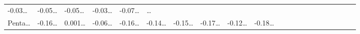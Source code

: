 \documentclass[
]{article}
\begin{document}
\begin{longtable}[]{@{}lllllllllllllllllllll@{}}
\begin{minipage}[t]{0.03\columnwidth}
-0.03\ldots{}\strut
\end{minipage} & \begin{minipage}[t]{0.03\columnwidth}\raggedright
-0.05\ldots{}\strut
\end{minipage} & \begin{minipage}[t]{0.03\columnwidth}\raggedright
-0.05\ldots{}\strut
\end{minipage} & \begin{minipage}[t]{0.03\columnwidth}\raggedright
-0.03\ldots{}\strut
\end{minipage} & \begin{minipage}[t]{0.03\columnwidth}\raggedright
-0.07\ldots{}\strut
\end{minipage} & \begin{minipage}[t]{0.01\columnwidth}\raggedright
\ldots{}\strut
\end{minipage}\tabularnewline
\begin{minipage}[t]{0.03\columnwidth}\raggedright
Penta\ldots{}\strut
\end{minipage} & \begin{minipage}[t]{0.03\columnwidth}\raggedright
-0.16\ldots{}\strut
\end{minipage} & \begin{minipage}[t]{0.03\columnwidth}\raggedright
0.001\ldots{}\strut
\end{minipage} & \begin{minipage}[t]{0.03\columnwidth}\raggedright
-0.06\ldots{}\strut
\end{minipage} & \begin{minipage}[t]{0.03\columnwidth}\raggedright
-0.16\ldots{}\strut
\end{minipage} & \begin{minipage}[t]{0.03\columnwidth}\raggedright
-0.14\ldots{}\strut
\end{minipage} & \begin{minipage}[t]{0.03\columnwidth}\raggedright
-0.15\ldots{}\strut
\end{minipage} & \begin{minipage}[t]{0.03\columnwidth}\raggedright
-0.17\ldots{}\strut
\end{minipage} & \begin{minipage}[t]{0.03\columnwidth}\raggedright
-0.12\ldots{}\strut
\end{minipage} & \begin{minipage}[t]{0.03\columnwidth}\raggedright
-0.18\ldots{}\strut
\end{minipage} & \begin{minipage}[t]{0.03\columnwidth}\raggedright

\end{minipage}
\end{longtable}
\end{document}
